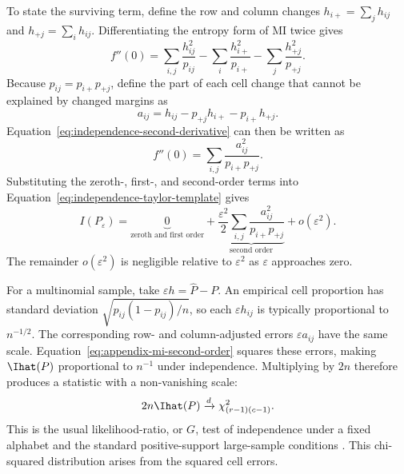 To state the surviving term, define the row and column changes
$h_{i+}=\sum_jh_{ij}$ and $h_{+j}=\sum_ih_{ij}$. Differentiating the entropy
form of MI twice gives
\begin{equation}
  f''(0)
  =\sum_{i,j}\frac{h_{ij}^2}{p_{ij}}
   -\sum_i\frac{h_{i+}^2}{p_{i+}}
   -\sum_j\frac{h_{+j}^2}{p_{+j}}.
  \label{eq:independence-second-derivative}
\end{equation}
Because $p_{ij}=p_{i+}p_{+j}$, define the part of each cell change that cannot
be explained by changed margins as
\begin{equation}
  a_{ij}=h_{ij}-p_{+j}h_{i+}-p_{i+}h_{+j}.
  \label{eq:independence-association-residual}
\end{equation}
Equation~\eqref{eq:independence-second-derivative} can then be written as
\begin{equation}
  f''(0)=\sum_{i,j}\frac{a_{ij}^2}{p_{i+}p_{+j}}.
  \label{eq:independence-quadratic-form}
\end{equation}
Substituting the zeroth-, first-, and second-order terms into
Equation~\eqref{eq:independence-taylor-template} gives
\begin{equation}
  \boxed{
  I(P_\varepsilon)
  =\underbrace{0}_{\text{zeroth and first order}}
  +\underbrace{\frac{\varepsilon^2}{2}
  \sum_{i,j}\frac{a_{ij}^2}{p_{i+}p_{+j}}
  }_{\text{second order}}
  +o(\varepsilon^2)
  }.
  \label{eq:appendix-mi-second-order}
\end{equation}
The remainder $o(\varepsilon^2)$ is negligible relative to
$\varepsilon^2$ as $\varepsilon$ approaches zero.

For a multinomial sample, take $\varepsilon h=\widehat P-P$. An empirical cell
proportion has standard deviation $\sqrt{p_{ij}(1-p_{ij})/n}$, so each
$\varepsilon h_{ij}$ is typically proportional to $n^{-1/2}$. The corresponding
row- and column-adjusted errors $\varepsilon a_{ij}$ have the same scale.
Equation~\eqref{eq:appendix-mi-second-order} squares these errors, making
$\Ihat(P)$ proportional to $n^{-1}$ under independence. Multiplying by $2n$
therefore produces a statistic with a non-vanishing scale:
\begin{equation}
  2n\Ihat(P)
  \xrightarrow{d}
  \chi^2_{(r-1)(c-1)}.
\end{equation}
This is the usual likelihood-ratio, or $G$, test of independence under a fixed
alphabet and the standard positive-support large-sample conditions
\citep{wilks1938,brillinger2004}. This chi-squared distribution arises from
the squared cell errors.


